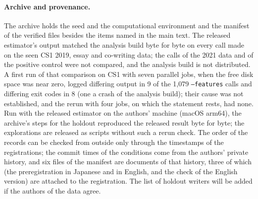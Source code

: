 \paragraph{Archive and provenance.} The archive holds the seed and the computational environment and the manifest of the
verified files besides the items named in the main text. The released estimator's output matched the analysis build
byte for byte on every call made on the seen CS1 2019, essay and co-writing data; the calls of the 2021 data and of the
positive control were not compared, and the analysis build is not distributed. A first run of that comparison on CS1 with seven parallel jobs, when the free disk space was near zero, logged
differing output in 9 of the 1,079 \texttt{--features} calls and differing exit codes in 8 (one a crash of the
analysis build); their cause was not
established, and the rerun with four jobs, on which the statement rests, had none. Run with the released estimator on the
authors' machine (macOS arm64), the archive's steps for the holdout reproduced the released result byte for byte; the
explorations are released as scripts without such a rerun check. The order of the records can be checked from outside
only through the timestamps of the registrations; the commit times of the conditions come from the authors' private
history, and six files of the manifest are documents of that history, three of which (the preregistration in Japanese
and in English, and the check of the English version) are attached to the registration. The list of holdout writers will
be added if the authors of the data agree.

